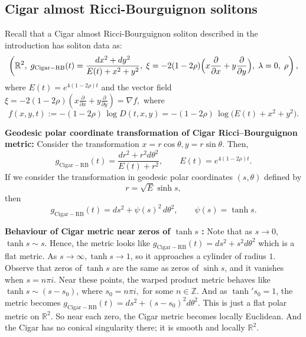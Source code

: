 \documentclass{article}
\theoremstyle{definition}
\theoremstyle{remark}
\begin{document}
\noindent
\subsection{Cigar almost  Ricci-Bourguignon solitons}\label{C-PC}
  Recall that a Cigar almost Ricci-Bourguignon  soliton  described in the introduction  has soliton data as:
\[
\left(\mathbb{R}^2,\;
g_{\mathrm{Cigar-RB}}(t) =\frac{dx^2+dy^2}{E(t)+x^2+y^2},\;
  \xi=-2 (1-2\rho) \Bigl(x\frac{\partial}{\partial x}
             +y\frac{\partial}{\partial y}\Bigr),\;
  \lambda=0, \;  \rho  \right),
\]
where  $E(t)=e^{4(1-2\rho)t}$  and the vector field
 $\xi = -2(1-2\rho)\left(x\frac{\partial}{\partial x}
                       +y\frac{\partial}{\partial y}\right) = \nabla f,$
where
\begin{equation*}
  f(x,y,t) := -(1-2\rho)\,\log D(t,x,y)
            = -(1-2\rho)\,\log\bigl(E(t)+x^2+y^2\bigr).
\end{equation*}

\vspace{0.1in}

\noindent
{\bf Geodesic polar coordinate transformation of Cigar Ricci--Bourguignon metric:}
Consider the transformation  $x = r \cos \theta, y = r \sin \theta$.
Then,
\begin{equation}\label{Cigar1}
g_{\mathrm{Cigar-RB}}(t) =   \frac{dr^2 + r^2 d\theta^2}{E(t) + r^2}, \qquad   E(t)=e^{4(1-2\rho)t}.
\end{equation}
If we consider the transformation in geodesic polar coordinates $(s,\theta)$ defined by
\[
r = \sqrt{E}\sinh s,
\]
then
\begin{equation}\label{iso1}
g_{\mathrm{Cigar-RB}}(t) =  ds^2 + \psi(s)^2\,d\theta^2, \qquad \psi(s)=\tanh s.
\end{equation}

\vspace{0.2in}
\noindent
{\bf Behaviour of Cigar metric near zeros of \boldmath$\tanh s$ \unboldmath:}
Note that as $s \rightarrow 0$,   $\tanh s \sim s$.
Hence, the metric looks like 
$g_{\mathrm{Cigar-RB}}(t) =  ds^2 + s^2 d\theta^2$
which is a flat metric.  
As $s \rightarrow \infty, \tanh s \rightarrow 1$, so it approaches a cylinder of radius $1$.
Observe that zeros of   $\tanh s$ are the same as zeros of  $\sinh s$, and it vanishes 
when $s = n \pi  i$. Near these points, the warped product metric behaves like 
$\tanh s \sim (s - s_{0})$, where $s_{0} =  n \pi  i,$ for some $n \in \mathbb{Z}$.
And as ${\tanh}' s_{0} =1$,  the metric becomes 
$g_{\mathrm{Cigar-RB}}(t) =  ds^2 + (s - s_{0})^2 d\theta^2$. 
This is just a flat polar metric on ${\mathbb R}^2$. So near each zero, the Cigar metric 
becomes locally Euclidean. And the Cigar has no conical singularity there; it is smooth and locally 
${\mathbb R}^2$.\\  
\end{document}
